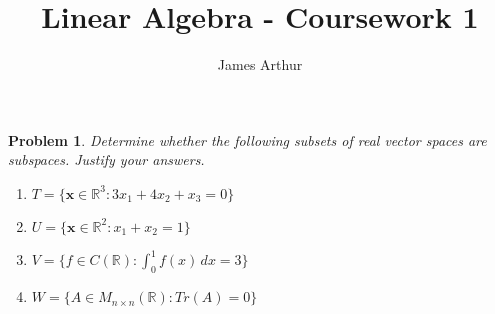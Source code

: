 \documentclass{article}
\title{Linear Algebra - Coursework 1}
\author{James Arthur}
\newcommand{\R}{\mathbb{R}}
\renewcommand{\vec}[1]{\boldsymbol{\mathbf{#1}}}
\newtheorem{problem}{Problem}
\begin{document}
\maketitle

\begin{problem}
  Determine whether the following subsets of real vector spaces are subspaces. Justify your answers.
  \begin{enumerate}
    \item $T = \{\vec x \in \R^3 : 3x_1 + 4x_2 + x_3 = 0\}$
    \item $\displaystyle{U = \{\vec x \in \R^2 : x_1 + x_2 = 1\}}$
    \item $V = \{ f \in C(\R) : \int_0^1 f(x)\,dx = 3 \}$
    \item $W = \{A \in M_{n \times n}(\R) : Tr(A) = 0\}$
  \end{enumerate}
\end{problem}
\end{document}
